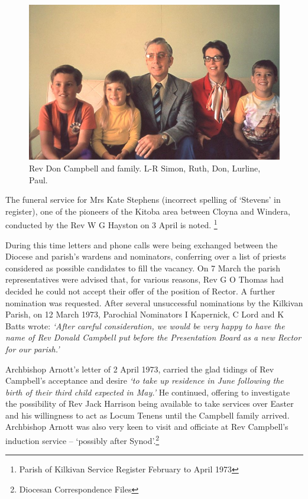 \begin{figure}
\begin{center}
\includegraphics[width=1.\linewidth,center]{../images/DonCampbellAndFamily.png}
\caption{Rev Don Campbell and family. L-R Simon, Ruth, Don, Lurline, Paul.}
\end{center}
\end{figure}




The funeral service for Mrs Kate Stephens (incorrect spelling of `Stevens' in register), one of the pioneers of the Kitoba area between Cloyna and Windera, conducted by the Rev W G Hayston on 3 April is noted. \footnote{Parish of Kilkivan Service Register February to April 1973}


During this time letters and phone calls were being exchanged between the Diocese and parish's wardens and nominators, conferring over a list of priests considered as possible candidates to fill the vacancy. On 7 March the parish representatives were advised that, for various reasons, Rev G O Thomas had decided he could not accept their offer of the position of Rector. A further nomination was requested. After several unsuccessful nominations by the Kilkivan Parish, on 12 March 1973, Parochial Nominators I Kapernick, C Lord and K Batts wrote: \emph{`After careful consideration, we would be very happy to have the name of Rev Donald Campbell put before the Presentation Board as a new Rector for our parish.'}



Archbishop Arnott's letter of 2 April 1973, carried the glad tidings of Rev Campbell's acceptance and desire \emph{`to take up residence in June following the birth of their third child expected in May.'} He continued, offering to investigate the possibility of Rev Jack Harrison being available to take services over Easter and his willingness to act as Locum Tenens until the Campbell family arrived. Archbishop Arnott was also very keen to visit and officiate at Rev Campbell's induction service -- `possibly after Synod'.\footnote{Diocesan Correspondence Files}


